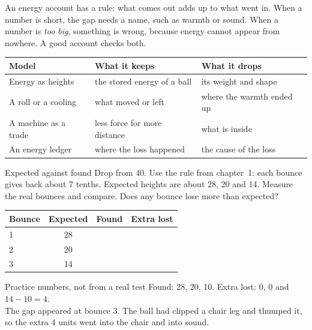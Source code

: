 \label{ch6}

An energy account has a rule: what comes out adds up to what went in. When a number is short, the gap needs a name, such as warmth or sound. When a number is \emph{too big}, something is wrong, because energy cannot appear from nowhere. A good account checks both.

\begin{center}
\sffamily\small\renewcommand{\arraystretch}{1.5}
\begin{tabular}{@{}p{3.4cm}p{3.7cm}p{3.7cm}@{}}
\toprule
\textbf{Model} & \textbf{What it keeps} & \textbf{What it drops}\\
\midrule
Energy as heights & the stored energy of a ball & its weight and shape\\
A roll or a cooling & what moved or left & where the warmth ended up\\
A machine as a trade & less force for more distance & what is inside\\
An energy ledger & where the loss happened & the cause of the loss\\
\bottomrule
\end{tabular}
\end{center}

\begin{tryit}{Expected against found}
Drop from 40. Use the rule from chapter~1: each bounce gives back about 7 tenths. Expected heights are about 28, 20 and 14. Measure the real bounces and compare. Does any bounce lose more than expected?\par\medskip
\renewcommand{\arraystretch}{1.6}
\begin{tabular}{|l|c|c|c|}
\hline
\textbf{Bounce} & \textbf{Expected} & \textbf{Found} & \textbf{Extra lost}\\ \hline
1 & 28 & & \\ \hline
2 & 20 & & \\ \hline
3 & 14 & & \\ \hline
\end{tabular}
\end{tryit}

\begin{worked}{Practice numbers, not from a real test}
Found: 28, 20, 10. Extra lost: 0, 0 and $14-10=4$.\\
The gap appeared at bounce 3. The ball had clipped a chair leg and thumped it, so the extra 4 units went into the chair and into sound.
\end{worked}

